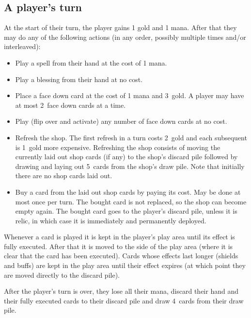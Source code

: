 \documentclass[dvipsnames,parskip,a4paper]{scrartcl}
\newcommand{\facedowncost}{3}
\newcommand{\refreshcost}{2}
\newcommand{\refreshcostincrease}{1}
\newcommand{\handsize}{4}
\newcommand{\dacedownsize}{2}
\newcommand{\shopsize}{5}
\begin{document}
\subsection*{A player's turn}

At the start of their turn, the player gains 1 gold and 1 mana. After that they may do any of the following actions (in any order, possibly multiple times and/or interleaved):

\begin{itemize}
\item Play a spell from their hand at the cost of 1 mana.
\item Play a blessing from their hand at no cost.
\item Place a face down card at the cost of 1 mana and \facedowncost \ gold. A player may have at most \dacedownsize \ face down cards at a time.
\item Play (flip over and activate) any number of face down cards at no cost.
\item Refresh the shop. The first refresh in a turn costs \refreshcost \ gold and each subsequent is \refreshcostincrease \ gold more expensive.
Refreshing the shop consists of moving the currently laid out shop cards (if any) to the shop's discard pile followed by drawing and laying out \shopsize \ cards from the shop's draw pile. Note that initially there are no shop cards laid out.
\item Buy a card from the laid out shop cards by paying its cost. May be done at most once per turn.
The bought card is not replaced, so the shop can become empty again. The bought card goes to the player's discard pile, unless it is relic, in which case it is immediately and permanently deployed.
\end{itemize}

Whenever a card is played it is kept in the player's play area until its effect is fully executed. After that it is moved to the side of the play area (where it is clear that the card has been executed). Cards whose effects last longer (shields and buffs) are kept in the play area until their effect expires (at which point they are moved directly to the discard pile).

\vspace{4pt}

After the player's turn is over, they lose all their mana, discard their hand and their fully executed cards to their discard pile and draw \handsize \ cards from their draw pile.

\newpage
\end{document}
